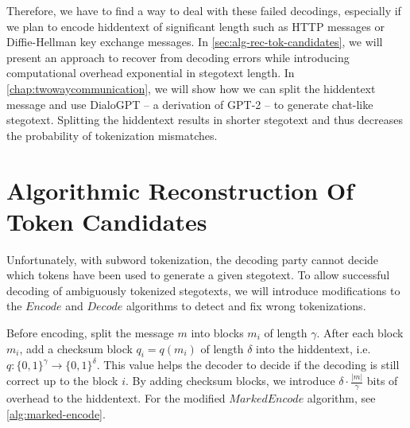 
Therefore, we have to find a way to deal with these failed decodings, especially if we plan to encode hiddentext of significant length such as HTTP messages or Diffie-Hellman key exchange messages.
In \autoref{sec:alg-rec-tok-candidates}, we will present an approach to recover from decoding errors while introducing computational overhead exponential in stegotext length. 
In \autoref{chap:twowaycommunication}, we will show how we can split the hiddentext message and use DialoGPT -- a derivation of GPT-2 -- to generate chat-like stegotext.
Splitting the hiddentext results in shorter stegotext and thus decreases the probability of tokenization mismatches.



\section{Algorithmic Reconstruction Of Token Candidates}
\label{sec:alg-rec-tok-candidates}

Unfortunately, with subword tokenization, the decoding party cannot decide which tokens have been used to generate a given stegotext.
To allow successful decoding of ambiguously tokenized stegotexts, we will introduce modifications to the $Encode$ and $Decode$ algorithms to detect and fix wrong tokenizations.

Before encoding, split the message $m$ into blocks $m_i$ of length $\gamma$.
After each block $m_i$, add a checksum block $q_i = q(m_i)$ of length $\delta$ into the hiddentext, i.e. $q \colon \{ 0,1 \}^\gamma \rightarrow \{ 0,1 \}^\delta$.
This value helps the decoder to decide if the decoding is still correct up to the block $i$.
By adding checksum blocks, we introduce $\delta \cdot \frac{|m|}{\gamma}$ bits of overhead to the hiddentext.
For the modified $MarkedEncode$ algorithm, see \autoref{alg:marked-encode}.

